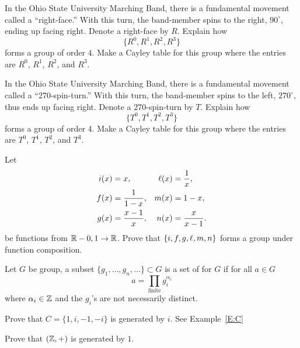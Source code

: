 \documentclass{ximera}
\begin{document}
\begin{exercise}
  In the Ohio State University Marching Band, there is a fundamental
  movement called a ``right-face.'' With this turn, the band-member
  spins to the right, $90^\circ$, ending up facing right. Denote a
  right-face by $R$. Explain how
  \[
  \{R^0,R^1,R^2,R^3\}
  \]
  forms a group of order $4$. Make a Cayley table for this group where the entries
  are $R^0$, $R^1$, $R^2$, and $R^3$.
\end{exercise}

\begin{exercise}
  In the Ohio State University Marching Band, there is a fundamental
  movement called a ``270-spin-turn.'' With this turn, the band-member
  spins to the left, $270^\circ$, thus ends up facing right. Denote a
  $270$-spin-turn by $T$. Explain how
  \[
  \{T^0,T^1,T^2,T^3\}
  \]
  forms a group of order $4$. Make a Cayley table for this group where
  the entries are $T^0$, $T^1$, $T^2$, and $T^3$.
\end{exercise}



\begin{exercise}\label{E:invg}
  Let
  \begin{align*}
    i(x) &= x,             & \ell(x) &= \frac{1}{x}, \\
    f(x) &= \frac{1}{1-x}, &  m(x) &= 1-x, \\
    g(x) &= \frac{x-1}{x}, &  n(x) &= \frac{x}{x-1}.
  \end{align*}
  be functions from $\mathbb R-{0,1}\to\mathbb R$.  Prove that $\{i,f,g,\ell,m,n\}$
  forms a group under function composition.
\end{exercise}


\begin{definition}
  Let $G$ be group, a subset $\{g_1,\dots, g_n,\dots\}\subset G$ is a
  set of  for $G$ if for all $a\in G$
  \[
  a = \prod_{\mathrm{finite}} g_i^{\alpha_i}
  \]
  where $\alpha_i\in \mathbb Z$ and the $g_i$'s are not necessarily distinct.
\end{definition}


\begin{exercise}
  Prove that $C =\{1,i,-1,-i\}$ is generated by $i$. See Example~\ref{E:C}
\end{exercise}

\begin{exercise}
  Prove that $(\mathbb Z,+)$ is generated by $1$.
\end{exercise}
\end{document}
